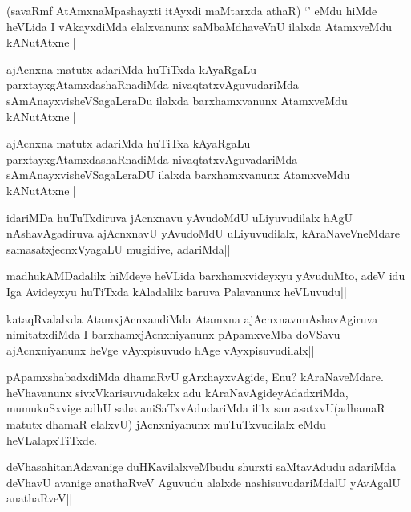 \begin{artha}
(savaRmf AtAmxnaMpashayxti itAyxdi maMtarxda athaR) `\stext' eMdu hiMde heVLida I vAkayxdiMda elalxvanunx saMbaMdhaveVnU ilalxda AtamxveMdu kANutAtxne||
\end{artha}

\begin{artha}
ajAcnxna matutx adariMda huTiTxda kAyaRgaLu parxtayxgAtamxdashaRnadiMda nivaqtatxvAguvudariMda sAmAnayxvisheVSagaLeraDu ilalxda barxhamxvanunx AtamxveMdu kANutAtxne||
\end{artha}

\begin{artha}
ajAcnxna matutx adariMda huTiTxa kAyaRgaLu parxtayxgAtamxdashaRnadiMda nivaqtatxvAguvadariMda sAmAnayxvisheVSagaLeraDU ilalxda barxhamxvanunx AtamxveMdu kANutAtxne||
\end{artha}

\begin{artha}
idariMDa huTuTxdiruva jAcnxnavu yAvudoMdU uLiyuvudilalx hAgU nAshavAgadiruva ajAcnxnavU yAvudoMdU uLiyuvudilalx, kAraNaveVneMdare samasatxjecnxVyagaLU mugidive, adariMda||
\end{artha}

\begin{artha}
madhukAMDadalilx hiMdeye heVLida barxhamxvideyxyu yAvuduMto, adeV idu Iga Avideyxyu huTiTxda kAladalilx baruva Palavanunx heVLuvudu||
\end{artha}


\begin{artha}
kataqRvalalxda AtamxjAcnxandiMda Atamxna ajAcnxnavunAshavAgiruva nimitatxdiMda I barxhamxjAcnxniyanunx pApamxveMba doVSavu ajAcnxniyanunx heVge vAyxpisuvudo hAge vAyxpisuvudilalx||
\end{artha}


\begin{artha}
pApamxshabadxdiMda dhamaRvU gArxhayxvAgide, Enu? kAraNaveMdare. heVhavanunx sivxVkarisuvudakekx adu kAraNavAgideyAdadxriMda, mumukuSxvige adhU saha aniSaTxvAdudariMda ililx samasatxvU(adhamaR matutx dhamaR elalxvU) jAcnxniyanunx muTuTxvudilalx eMdu heVLalapxTiTxde.
\end{artha}


\begin{artha}
deVhasahitanAdavanige duHKavilalxveMbudu shurxti saMtavAdudu adariMda deVhavU avanige anathaRveV Aguvudu alalxde nashisuvudariMdalU yAvAgalU anathaRveV||
\end{artha}

